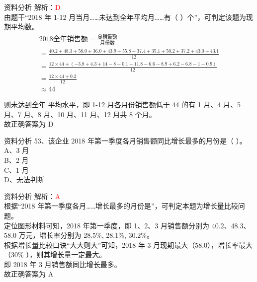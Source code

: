 \documentclass[aspectratio=169]{beamer}
\begin{document}
\begin{frame}[t]{资料分析}
    解析：\textcolor{red}{D}\\
    由题干“2018 年 1-12 月当月……未达到全年平均月……有（ ）个”，可判定该题为现期平均数。
    { \scriptsize
    \begin{gather}
        \text{2018全年销售额} = \frac{\text{总销售额}}{\text{月份数}} \\
        = \frac{40.2 + 48.3 + 58.0 + 36.0 + 43.9 + 55.8+ 37.4 + 35.1+50.2+37.2+43.0+43.1}{12} \\
        = \frac{12 \times 44 + (-3.8+4.3+14-8-0.1+11.8-6.6-8.9+6.2-6.8-1-0.9)}{12} \\
        = \frac{12 \times 44 + 0.2}{12} \\
        \approx 44
    \end{gather}
    }

    则未达到全年
    平均水平，即 1-12 月各月份销售额低于 44 的有 1 月、4 月、5 月、7 月、8 月、10 月、11 月、12 月共 8 个月。\\
    故正确答案为 D
\end{frame}                           





\begin{frame}[t]{资料分析}
    53、该企业 2018 年第一季度各月销售额同比增长最多的月份是（ ）。  \\
    A、3 月                                                          \\
    B、2 月                                                          \\
    C、1 月                                                          \\ 
    D、无法判断                                                      \\
\end{frame}                           

\begin{frame}[t]{资料分析}
    解析：\textcolor{red}{A}\\
    根据“2018 年第一季度各月……增长最多的月份是”，可判定本题为增长量比较问题。\\
    定位图形材料可知，2018 年第一季度，即 1、2、3 月销售额分别为 40.2、48.3、58.0 万元，增长率分别为 28.5\%, 28.1\%, 30.2\%。\\
    根据增长量比较口诀“大大则大”可知，2018 年 3 月现期最大（58.0），增长率最大（30\% ），则其增长量一定最大。\\
    即 2018 年 3 月销售额同比增长最多。\\
    故正确答案为 A
\end{frame}                           
\end{document}

